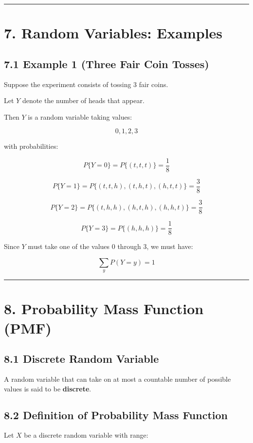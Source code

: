 \documentclass[12pt]{article}
\begin{document}
\hrule
\vspace{1em}

\section*{\textbf{7. Random Variables: Examples}}

\subsection*{\textbf{7.1 Example 1 (Three Fair Coin Tosses)}}

Suppose the experiment consists of tossing 3 fair coins.

Let $Y$ denote the number of heads that appear.

Then $Y$ is a random variable taking values:

\[
0, 1, 2, 3
\]

with probabilities:

\[
P\{Y = 0\} = P\{(t,t,t)\} = \frac{1}{8}
\]

\[
P\{Y = 1\} = P\{(t,t,h),(t,h,t),(h,t,t)\} = \frac{3}{8}
\]

\[
P\{Y = 2\} = P\{(t,h,h),(h,t,h),(h,h,t)\} = \frac{3}{8}
\]

\[
P\{Y = 3\} = P\{(h,h,h)\} = \frac{1}{8}
\]

Since $Y$ must take one of the values $0$ through $3$, we must have:

\[
\sum_y P(Y=y) = 1
\]

\hrule
\vspace{1em}

\section*{\textbf{8. Probability Mass Function (PMF)}}

\subsection*{\textbf{8.1 Discrete Random Variable}}

A random variable that can take on at most a countable number of possible values is said to be \textbf{discrete}.

\subsection*{\textbf{8.2 Definition of Probability Mass Function}}

Let $X$ be a discrete random variable with range:
\end{document}
